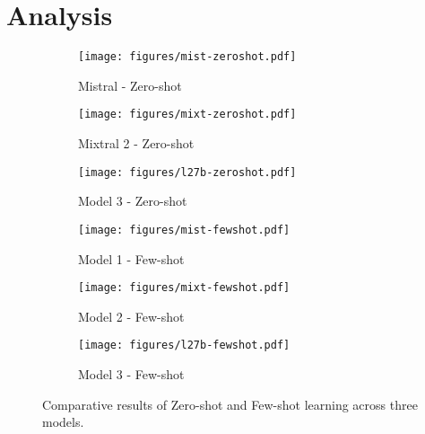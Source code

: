 \section{Analysis}

\begin{figure*}
    \centering
    \begin{subfigure}{0.32\textwidth}
        \texttt{[image: figures/mist-zeroshot.pdf]}
        \caption{Mistral - Zero-shot}
        \label{fig:model1_zero}
    \end{subfigure}
    \hfill
    \begin{subfigure}{0.32\textwidth}
        \texttt{[image: figures/mixt-zeroshot.pdf]}
        \caption{Mixtral 2 - Zero-shot}
        \label{fig:model2_zero}
    \end{subfigure}
    \hfill
    \begin{subfigure}{0.32\textwidth}
        \texttt{[image: figures/l27b-zeroshot.pdf]}
        \caption{Model 3 - Zero-shot}
        \label{fig:model3_zero}
    \end{subfigure}
    \hfill
    \begin{subfigure}{0.32\textwidth}
        \texttt{[image: figures/mist-fewshot.pdf]}
        \caption{Model 1 - Few-shot}
        \label{fig:model1_few}
    \end{subfigure}
    \hfill
    \begin{subfigure}{0.32\textwidth}
        \texttt{[image: figures/mixt-fewshot.pdf]}
        \caption{Model 2 - Few-shot}
        \label{fig:model2_few}
    \end{subfigure}
    \hfill
    \begin{subfigure}{0.32\textwidth}
        \texttt{[image: figures/l27b-fewshot.pdf]}
        \caption{Model 3 - Few-shot}
        \label{fig:model3_few}
    \end{subfigure}
    \hfill
    \caption{Comparative results of Zero-shot and Few-shot learning across three models.}
    \label{fig:gains}
\end{figure*}

